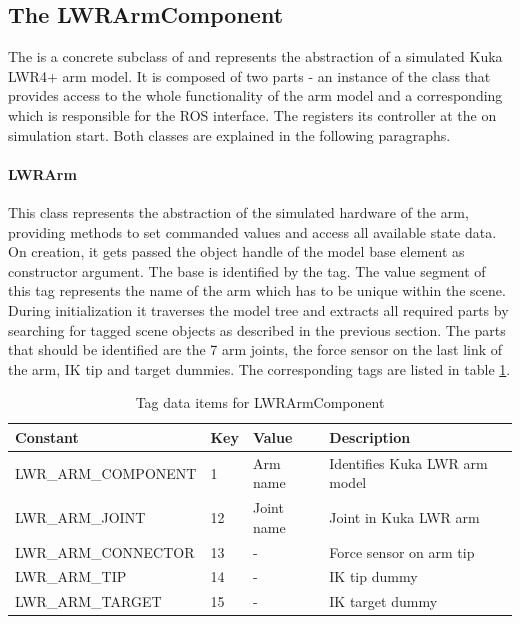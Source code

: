 \subsection{The LWRArmComponent}

The  is a concrete subclass of  and represents the abstraction of a simulated Kuka LWR4+ arm model. It is composed of two parts - an instance of the  class that provides access to the whole functionality of the arm model and a corresponding  which is responsible for the ROS interface. The  registers its controller at the  on simulation start. Both classes are explained in the following paragraphs.

\paragraph{LWRArm}

This class represents the abstraction of the simulated hardware of the arm, providing methods to set commanded values and access all available state data. On creation, it gets passed the object handle of the model base element as constructor argument. The base is identified by the  tag. The value segment of this tag represents the name of the arm which has to be unique within the scene. During initialization it traverses the model tree and extracts all required parts by searching for tagged scene objects as described in the previous section. The parts that should be identified are the 7 arm joints, the force sensor on the last link of the arm, IK tip and target dummies. The corresponding tags are listed in table \ref{fig:lwr_tags}. \\

\begin{table}[ht]
  \centering
  \begin{tabularx}{\textwidth}{|l|l|l|X|} \hline
	\textbf{Constant} & \textbf{Key} & \textbf{Value} & \textbf{Description} \\ \hline
	LWR\_ARM\_COMPONENT & 1 & Arm name & Identifies Kuka LWR arm model \\
	LWR\_ARM\_JOINT & 12 & Joint name & Joint in Kuka LWR arm \\
	LWR\_ARM\_CONNECTOR & 13 & - & Force sensor on arm tip \\
	LWR\_ARM\_TIP & 14 & - & IK tip dummy \\
	LWR\_ARM\_TARGET & 15 & - & IK target dummy  \\ \hline
  \end{tabularx}
  \caption{Tag data items for LWRArmComponent}
  \label{fig:lwr_tags}
\end{table}

